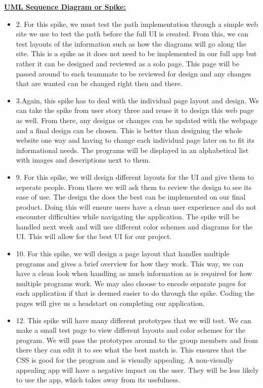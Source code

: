 \documentclass[12pt, letterpaper]{article}
\begin{document}
\underline{\textbf{UML Sequence Diagram or Spike:}}
\begin{itemize}
	\item 2. For this spike, we must test the path implementation through a simple web site we use to test the path before the full UI is created. From this, we can test layouts of the information such as how the diagrams will go along the site. This is a spike as it does not need to be implemented in our full app but rather it can be designed and reviewed as a solo page. This page will be passed around to each teammate to be reviewed for design and any changes that are wanted can be changed right then and there.
	\item 3.Again, this spike has to deal with the individual page layout and design. We can take the spike from user story three and reuse it to design this web page as well. From there, any designs or changes can be updated with the webpage and a final design can be chosen. This is better than designing the whole website one way and having to change each individual page later on to fit its informational needs. The programs will be displayed in an alphabetical list with images and descriptions next to them.
	\item 9. For this spike, we will design different layouts for the UI and give them to seperate people. From there we will ask them to review the design to see its ease of use. The design the does the best can be implemented on our final product. Doing this will ensure users have a clean user experience and do not encounter difficulties while navigating the application. The spike will be handled next week and will use different color schemes and diagrams for the UI. This will allow for the best UI for our project.
	\item 10. For this spike, we will design a page layout that handles multiple programs and gives a brief overview for how they work. This way, we can have a clean look when handling as much information as is required for how multiple programs work. We may also choose to encode separate pages for each application if that is deemed easier to do through the spike. Coding the pages will give us a headstart on completing our application.
	\item 12. This spike will have many different prototypes that we will test. We can make a small test page to view different layouts and color schemes for the program. We will pass the prototypes around to the group members and from there they can edit it to see what the best match is. This ensures that the CSS is good for the program and is visually appealing. A non-visually appealing app will have a negative impact on the user. They will be less likely to use the app, which takes away from its usefulness.
\end{itemize}
\end{document}
